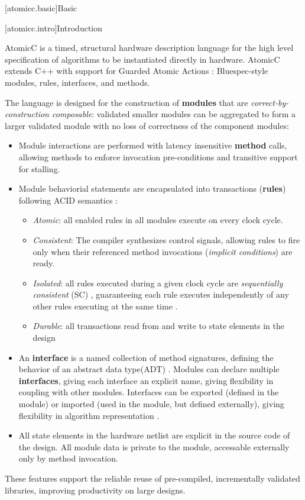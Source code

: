 [atomicc.basic]{Basic}

[atomicc.intro]{Introduction}

AtomicC is a timed, structural hardware description language for
the high level specification of algorithms to be instantiated
directly in hardware.
AtomicC extends C++
with support for Guarded Atomic Actions
\cite{Hoe:Thesis,HoeArvind:TRS_Synthesis2,Dave2007}:
Bluespec-style\cite{Bluespec:www}
modules, rules, interfaces, and methods.

The language is designed for
the construction of \textbf{modules} that are \textit{correct-by-construction composable}:
validated smaller modules can be aggregated to form
a larger validated module with
no loss of correctness of the component modules:
\begin{itemize}
\item Module interactions are performed with
latency insensitive\cite{Ng2010,AbbasB18}
\textbf{method} calls, allowing methods to enforce invocation pre-conditions
and transitive support for stalling.
\item Module behaviorial statements are encapsulated into transactions (\textbf{rules})
following ACID semantics
\cite{NikhilSemantics,GrayR93}:
\begin{itemize}
\item \textit{Atomic}: all enabled rules in all modules execute on every clock cycle.
\item \textit{Consistent}: The compiler synthesizes control signals, allowing rules to fire
only when their referenced method invocations (\textit{implicit conditions})
are ready.
\item \textit{Isolated}: all rules executed during a given clock cycle are
\textit{sequentially consistent} (SC) \cite{Lamport:1979:MMC:1311099.1311750},
guaranteeing each rule executes
independently of any other rules executing at the same time
\cite[Sec.~7.1]{GrayR93}.
\item \textit{Durable}: all transactions read from and write to state elements in the design
\end{itemize}

\item An \textbf{interface} is a named collection of method signatures, defining
the behavior of an abstract data type(ADT) \cite{Liskov74programmingwith}.
Modules can declare
multiple \textbf{interfaces}, giving each interface an explicit name,
giving flexibility in coupling with other modules.
Interfaces can be exported (defined in the module) or imported (used in
the module, but defined externally), giving flexibility in algorithm
representation \cite[Sec.~4.1]{Dave:ROB}.
\item All state elements in the hardware
netlist are explicit in the source code of the design.
All module data is private to the module, accessable externally only by method invocation.
\end{itemize}
These features support the reliable reuse of pre-compiled, incrementally validated
libraries, improving productivity on large designs.


